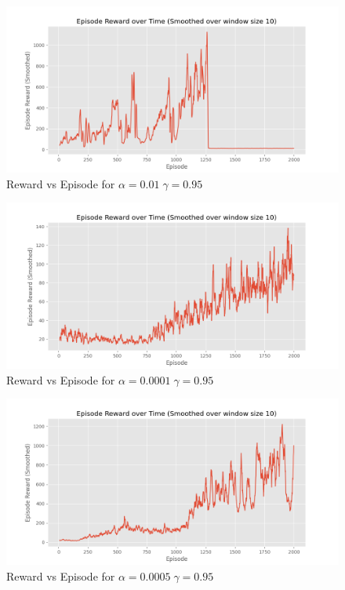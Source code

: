 \documentclass[a4paper]{article}
\theoremstyle{definition}
\newenvironment{soln}{
    \leavevmode\color{blue}\ignorespaces
}{}
\begin{document}
\begin{enumerate}
\begin{soln}
    \begin{figure}[H]
        \centering
        \includegraphics[width=0.8\linewidth]{5_2_b.png}
        \caption{Reward vs Episode for $\alpha = 0.01 \; \gamma = 0.95$}
        \label{fig:q52}
    \end{figure}

    \begin{figure}[H]
        \centering
        \includegraphics[width=0.8\linewidth]{5_3_b.png}
        \caption{Reward vs Episode for $\alpha = 0.0001 \; \gamma = 0.95$}
        \label{fig:q53}
    \end{figure}

    \begin{figure}[H]
        \centering
        \includegraphics[width=0.8\linewidth]{5_4_b.png}
        \caption{Reward vs Episode for $\alpha = 0.0005 \; \gamma = 0.95$}
        \label{fig:q54}
    \end{figure}


\end{soln}
\end{enumerate}
\end{document}
